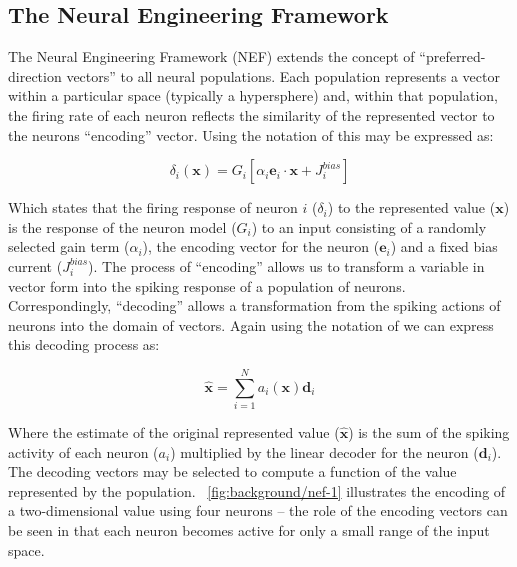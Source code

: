 \documentclass[conference]{IEEEtran}
\renewcommand{\vec}{\mathbf}  %
\begin{document}
  \subsection{The Neural Engineering Framework}
  \label{sef:background/nef}

The Neural Engineering Framework (NEF) extends the concept of ``preferred-direction vectors'' \parencite{} to all neural populations.
Each population represents a vector within a particular space (typically a hypersphere) and, within that population, the firing rate of each neuron reflects the similarity of the represented vector to the neurons ``encoding'' vector.
Using the notation of \textcite{Stewart2014} this may be expressed as:

\begin{equation}
  \delta_{i}\left(\vec{x}\right) = G_{i}\left[ \alpha_i \vec{e}_i \cdot \vec{x} + J^{bias}_i \right]
  \label{eq:encoding}
\end{equation}

Which states that the firing response of neuron $i$ ($\delta_i$) to the represented value ($\vec{x}$) is the response of the neuron model ($G_{i}$) to an input consisting of a randomly selected gain term ($\alpha_i$), the encoding vector for the neuron ($\vec{e}_i$) and a fixed bias current ($J^{bias}_i$).
The process of ``encoding'' allows us to transform a variable in vector form into the spiking response of a population of neurons.
Correspondingly, ``decoding'' allows a transformation from the spiking actions of neurons into the domain of vectors.
Again using the notation of \textcite{Stewart2014} we can express this decoding process as:

\begin{equation}
  \vec{\hat{x}} = \sum\limits_{i=1}^{N} a_i(\vec{x})\vec{d}_i  \label{eq:decoding}
\end{equation}

Where the estimate of the original represented value ($\vec{\hat{x}}$) is the sum of the spiking activity of each neuron ($a_i$) multiplied by the linear decoder for the neuron ($\vec{d}_i$).
The decoding vectors may be selected to compute a function of the value represented by the population.
\figurename~\ref{fig:background/nef-1} illustrates the encoding of a two-dimensional value using four neurons -- the role of the encoding vectors can be seen in that each neuron becomes active for only a small range of the input space.
\end{document}
